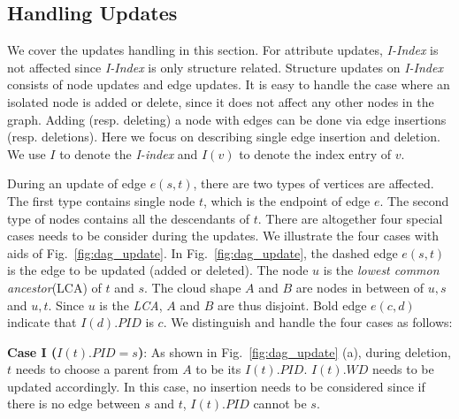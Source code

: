 \subsection{Handling Updates}
We cover the updates handling in this section. For attribute updates, \emph{I-Index} is not affected since \emph{I-Index} is only structure related. Structure updates on \emph{I-Index} consists of node updates and edge updates. It is easy to handle the case where an isolated node is added or delete, since it does not affect any other nodes in the graph. Adding (resp. deleting) a node with edges can be done via edge insertions (resp. deletions). Here we focus on describing single edge insertion and deletion. We use $I$ to denote the \emph{I-index} and $I(v)$ to denote the index entry of $v$. 

During an update of edge $e(s,t)$, there are two types of vertices are affected. The first type contains single node $t$, which is the endpoint of edge $e$. The second type of nodes contains all the descendants of $t$. There are altogether four special cases needs to be consider during the updates. We illustrate the four cases with aids of Fig.~\ref{fig:dag_update}. In Fig.~\ref{fig:dag_update}, the dashed edge $e(s,t)$ is the edge to be updated (added or deleted). The node $u$ is the \emph{lowest common ancestor}(LCA) of $t$ and $s$. The cloud shape $A$ and $B$ are nodes in between of $u,s$ and $u,t$. Since $u$ is the \emph{LCA}, $A$ and $B$ are thus disjoint. Bold edge $e(c,d)$ indicate that $I(d).PID$ is $c$. We distinguish and handle the four cases as follows:

\textbf{Case I ($I(t).PID = s$)}: As shown in Fig.~\ref{fig:dag_update} (a), during deletion, $t$ needs to choose a parent from $A$ to be its $I(t).PID$. $I(t).WD$ needs to be updated accordingly. In this case, no insertion needs to be considered since if there is no edge between $s$ and $t$, $I(t).PID$ cannot be $s$. 


